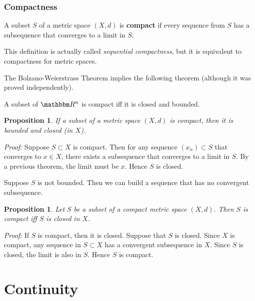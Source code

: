 \documentclass[9pt,aspectratio=169]{beamer}
\newcommand{\RR}{\mathbbm R}
\newtheorem{proposition}[theorem]{Proposition}
\begin{document}
\begin{frame}[allowframebreaks]
    \frametitle{Compactness}
    \begin{definition}
        A subset $S$ of a metric space $(X, d)$ is \textbf{compact} if every
        sequence from $S$ has a subsequence that converges to a limit in $S$.
    \end{definition}
    This definition is actually called \emph{sequential compactness}, but it
    is equivalent to compactness for metric spaces.

    The Bolzano-Weierstrass Theorem implies the following theorem (although
    it was proved independently).
    \begin{theorem}
        A subset of $\RR^n$ is compact iff it is closed and bounded.
    \end{theorem}
    \framebreak
    \begin{proposition}
        If a subset of a metric space $(X, d)$ is compact, then it is bounded
        and closed (in $X$).
    \end{proposition}
    \emph{Proof:} Suppose $S \subset X$ is compact. Then for any sequence
    $(x_n) \subset S$ that converges to $x \in X$, there exists a subsequence
    that converges to a limit in $S$. By a previous theorem, the limit must
    be $x$. Hence $S$ is closed.

    Suppose $S$ is not bounded. Then we can build a sequence that has no
    convergent subsequence.
    \framebreak
    \begin{proposition}
        Let $S$ be a subset of a compact metric space $(X, d)$. Then $S$ is
        compact iff $S$ is closed in $X$.
    \end{proposition}
    \emph{Proof:} If $S$ is compact, then it is closed. Suppose that $S$ is
    closed. Since $X$ is compact, any sequence in $S \subset X$ has a
    convergent subsequence in $X$. Since $S$ is closed, the limit is also in
    $S$. Hence $S$ is compact.
\end{frame}

\section{Continuity}
\end{document}
